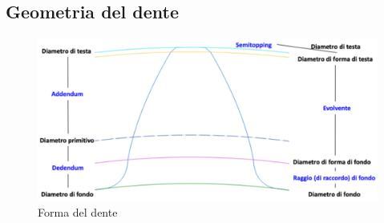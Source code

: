 \subsection{Geometria del dente}
\begin{figure}[h]
    \centering
    \includegraphics[scale=0.35]{Immagini/FormaDente.png}
    \caption{Forma del dente}
    \label{fig:FormaDente}
\end{figure}

